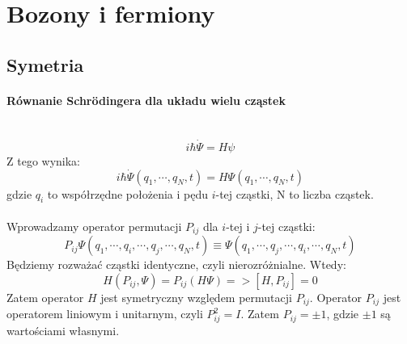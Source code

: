 \section{Bozony i fermiony}
\subsection{Symetria}
\paragraph*{Równanie Schrödingera dla układu wielu cząstek}\mbox{}\\
%
\begin{equation*}
    i \hbar \dot{\Psi} = H \psi
\end{equation*}
%
Z tego wynika: 
%
\begin{equation*}
    i \hbar \dot{\Psi}(q_1, \cdots, q_N, t) = H \Psi(q_1, \cdots, q_N, t)
\end{equation*}
%
gdzie $q_i$ to współrzędne położenia i pędu $i$-tej cząstki, N to liczba cząstek.
%
\\ \\
%
Wprowadzamy operator permutacji $P_{ij}$ dla $i$-tej i $j$-tej cząstki:
%
\begin{equation*}
    P_{ij} \Psi(q_1, \cdots, q_i, \cdots, q_j, \cdots, q_N, t) \equiv \Psi(q_1, \cdots, q_j, \cdots, q_i, \cdots, q_N, t)
\end{equation*}
%
Będziemy rozważać cząstki identyczne, czyli nierozróżnialne. Wtedy:
%
\begin{equation*}
    H(P_{ij}, \Psi) = P_{ij} (H \Psi) => [H, P_{ij}] = 0
\end{equation*}
%
Zatem operator $H$ jest symetryczny względem permutacji $P_{ij}$.
%
Operator $P_{ij}$ jest operatorem liniowym i unitarnym, czyli $P_{ij}^2 = I$. Zatem $P_{ij} = \pm 1$, gdzie $\pm 1$ są wartościami własnymi.
%
